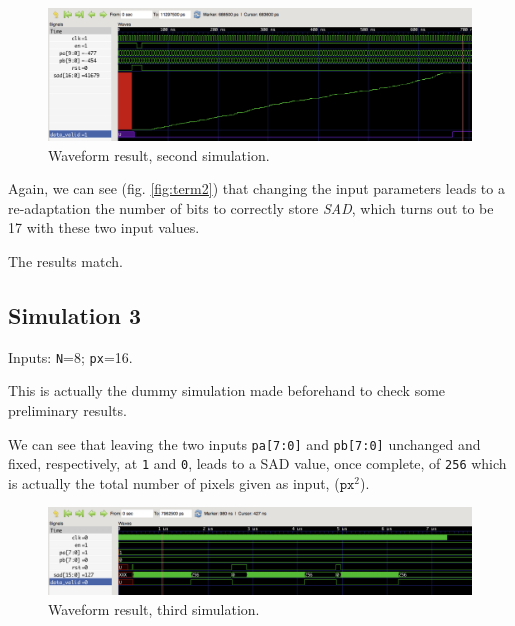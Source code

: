 \documentclass[12pt, a4paper]{article}
\begin{document}
\begin{figure}[h!]
\includegraphics[scale=0.18]{../screenshots/gtkwave/sim2_gtkwave.png}
\caption{Waveform result, second simulation.}\label{fig:wave3}
\end{figure}

Again, we can see (fig. \ref{fig:term2}) that changing the input parameters leads to a re-adaptation the number of bits to correctly store \textit{SAD}, which turns out to be 17 with these two input values. 

The results match.


\newpage

\subsection{Simulation 3}
Inputs: \texttt{N}=8; \texttt{px}=16.

This is actually the dummy simulation made beforehand to check some preliminary results. 

We can see that leaving the two inputs \texttt{pa[7:0]} and \texttt{pb[7:0]} unchanged and fixed, respectively, at \texttt{1} and \texttt{0}, leads to a SAD value, once complete, of \texttt{256} which is actually the total number of pixels given as input, ($\texttt{px}^2$).




\begin{figure}[h!]
\includegraphics[scale=0.18]{../screenshots/gtkwave/sim3_gtkwave.png}
\caption{Waveform result, third simulation.}%
\end{figure}



\newpage
\end{document}
